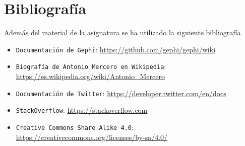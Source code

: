 \chapter{Bibliografía}

Además del material de la asignatura se ha utilizado la siguiente bibliografía

\begin{itemize}
\item{\tt Documentación de Gephi}: \url{https://github.com/gephi/gephi/wiki}
\item{\tt Biografía de Antonio Mercero en Wikipedia}: \url{https://es.wikipedia.org/wiki/Antonio_Mercero}
\item{\tt Documentación de Twitter}: \url{https://developer.twitter.com/en/docs}
\item{\tt StackOverflow}: \url{https://stackoverflow.com}
\item{\tt Creative Commons Share Alike 4.0}: \url{https://creativecommons.org/licenses/by-sa/4.0/}
\end{itemize}


